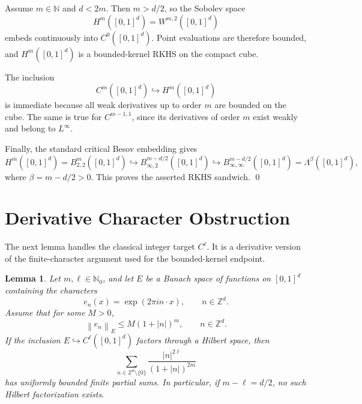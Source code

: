 \documentclass[11pt]{article}
\newtheorem{lemma}{Lemma}
\newcommand{\N}{\mathbb{N}}
\newcommand{\Lam}{\Lambda}
\newcommand{\norm}[1]{\left\lVert #1\right\rVert}
\newcommand{\abs}[1]{\left\lvert #1\right\rvert}
\begin{document}
Assume \(m\in\N\) and \(d<2m\). Then \(m>d/2\), so the Sobolev space
\[
  H^m([0,1]^d)=W^{m,2}([0,1]^d)
\]
embeds continuously into \(C^0([0,1]^d)\). Point evaluations are therefore
bounded, and \(H^m([0,1]^d)\) is a bounded-kernel RKHS on the compact cube.

The inclusion
\[
  C^m([0,1]^d)\hookrightarrow H^m([0,1]^d)
\]
is immediate because all weak derivatives up to order \(m\) are bounded on
the cube. The same is true for \(C^{m-1,1}\), since its derivatives of order
\(m\) exist weakly and belong to \(L^\infty\).

Finally, the standard critical Besov embedding gives
\[
  H^m([0,1]^d)=B^m_{2,2}([0,1]^d)
  \hookrightarrow
  B^{m-d/2}_{\infty,2}([0,1]^d)
  \hookrightarrow
  B^{m-d/2}_{\infty,\infty}([0,1]^d)
  =
  \Lam^\beta([0,1]^d),
\]
where \(\beta=m-d/2>0\). This proves the asserted RKHS sandwich.
\qed

\section*{Derivative Character Obstruction}

The next lemma handles the classical integer target \(C^\ell\). It is a
derivative version of the finite-character argument used for the
bounded-kernel endpoint.

\begin{lemma}\label{lem:derivative-characters}
Let \(m,\ell\in\N_0\), and let \(E\) be a Banach space of functions on
\([0,1]^d\) containing the characters
\[
  e_n(x)=\exp(2\pi i n\cdot x),\qquad n\in\mathbb Z^d.
\]
Assume that for some \(M>0\),
\[
  \norm{e_n}_E\le M(1+\abs n)^m,\qquad n\in\mathbb Z^d.
\]
If the inclusion \(E\hookrightarrow C^\ell([0,1]^d)\) factors through a
Hilbert space, then
\[
  \sum_{n\in\mathbb Z^d\setminus\{0\}}
  \frac{\abs{n}^{2\ell}}{(1+\abs{n})^{2m}}
\]
has uniformly bounded finite partial sums. In particular, if
\(m-\ell=d/2\), no such Hilbert factorization exists.
\end{lemma}
\end{document}

